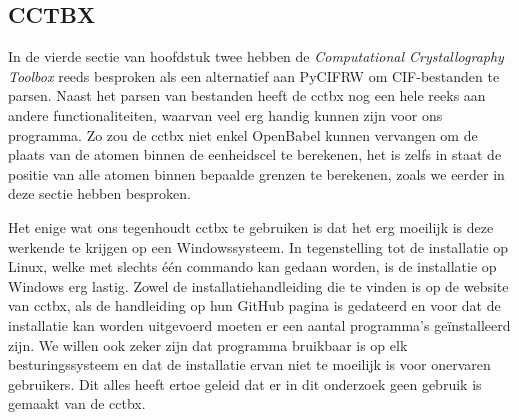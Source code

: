 \subsection{CCTBX}
In de vierde sectie van hoofdstuk twee hebben de \textit{Computational Crystallography Toolbox} reeds besproken als een alternatief aan PyCIFRW om CIF-bestanden te parsen. Naast het parsen van bestanden heeft de cctbx nog een hele reeks aan andere functionaliteiten, waarvan veel erg handig kunnen zijn voor ons programma. Zo zou de cctbx niet enkel OpenBabel kunnen vervangen om de plaats van de atomen binnen de eenheidscel te berekenen, het is zelfs in staat de positie van alle atomen binnen bepaalde grenzen te berekenen, zoals we eerder in deze sectie hebben besproken.
\par
Het enige wat ons tegenhoudt cctbx te gebruiken is dat het erg moeilijk is deze werkende te krijgen op een Windowssysteem. In tegenstelling tot de installatie op Linux, welke met slechts één commando kan gedaan worden, is de installatie op Windows erg lastig. Zowel de installatiehandleiding die te vinden is op de website van cctbx, als de handleiding op hun GitHub pagina is gedateerd en voor dat de installatie kan worden uitgevoerd moeten er een aantal programma's geïnstalleerd zijn. We willen ook zeker zijn dat programma bruikbaar is op elk besturingssysteem en dat de installatie ervan niet te moeilijk is voor onervaren gebruikers. Dit alles heeft ertoe geleid dat er in dit onderzoek geen gebruik is gemaakt van de cctbx.

